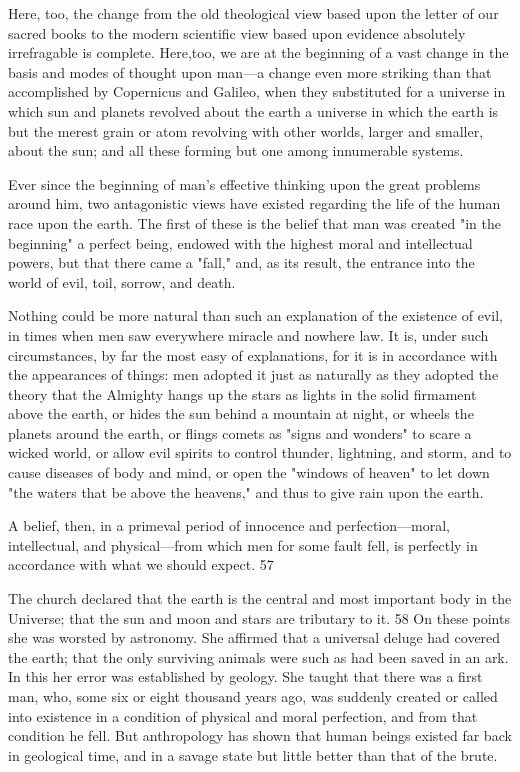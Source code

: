Here, too, the change from the old theological view based upon the letter of our sacred books
to the modern scientific view based upon evidence absolutely irrefragable is complete. Here,too, we are at the beginning of a vast change in the basis and modes of thought upon man—a
change even more striking than that accomplished by Copernicus and Galileo, when they
substituted for a universe in which sun and planets revolved about the earth a universe in
which the earth is but the merest grain or atom revolving with other worlds, larger and
smaller, about the sun; and all these forming but one among innumerable systems.

Ever since the beginning of man's effective thinking upon the great problems around him,
two antagonistic views have existed regarding the life of the human race upon the earth. The
first of these is the belief that man was created "in the beginning" a perfect being, endowed
with the highest moral and intellectual powers, but that there came a "fall," and, as its result,
the entrance into the world of evil, toil, sorrow, and death.

Nothing could be more natural than such an explanation of the existence of evil, in times
when men saw everywhere miracle and nowhere law. It is, under such circumstances, by far
the most easy of explanations, for it is in accordance with the appearances of things: men
adopted it just as naturally as they adopted the theory that the Almighty hangs up the stars as
lights in the solid firmament above the earth, or hides the sun behind a mountain at night, or
wheels the planets around the earth, or flings comets as "signs and wonders" to scare a
wicked world, or allow evil spirits to control thunder, lightning, and storm, and to cause
diseases of body and mind, or open the "windows of heaven" to let down "the waters that be
above the heavens," and thus to give rain upon the earth.

A belief, then, in a primeval period of innocence and perfection—moral, intellectual, and
physical—from which men for some fault fell, is perfectly in accordance with what we
should expect. 57

The church declared that the earth is the central and most important body in the Universe;
that the sun and moon and stars are tributary to it. 58 On these points she was worsted by
astronomy. She affirmed that a universal deluge had covered the earth; that the only
surviving animals were such as had been saved in an ark. In this her error was established by
geology. She taught that there was a first man, who, some six or eight thousand years ago,
was suddenly created or called into existence in a condition of physical and moral perfection,
and from that condition he fell. But anthropology has shown that human beings existed far
back in geological time, and in a savage state but little better than that of the brute.

